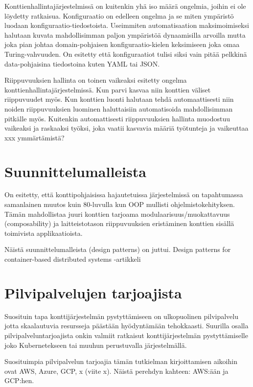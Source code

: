 \documentclass[finnish]{tktltiki2}
\theoremstyle{definition}
\theoremstyle{remark}
\begin{document}
Konttienhallintajärjestelmissä on kuitenkin yhä iso määrä ongelmia, joihin ei ole löydetty ratkaisua. Konfiguraatio on edelleen ongelma ja se miten ympäristö luodaan konfiguraatio-tiedostoista. Useimmiten automatisaation maksimoimiseksi halutaan kuvata mahdollisimman paljon ympäristöä dynaamisilla arvoilla mutta joka pian johtaa domain-pohjaisen konfiguraatio-kielen keksimiseen joka omaa Turing-vahvuuden. On esitetty että konfiguraatiot tulisi siksi vain pitää pelkkinä data-pohjaisina tiedostoina kuten YAML tai JSON.

Riippuvuuksien hallinta on toinen vaikeaksi esitetty ongelma konttienhallintajärjestelmissä. Kun parvi kasvaa niin konttien väliset riippuvuudet myös. Kun konttien luonti halutaan tehdä automaattisesti niin noiden riippuvuuksien luominen haluttaisiin automatisoida mahdollisimman pitkälle myös. Kuitenkin automattisesti riippuvuuksien hallinta muodostuu vaikeaksi ja raskaaksi työksi, joka vaatii kasvavia määriä työtunteja ja vaikeuttaa xxx ymmärtämistä?

\section{Suunnittelumalleista}

On esitetty, että konttipohjaisissa hajautetuissa järjestelmissä on tapahtumassa samanlainen muutos kuin 80-luvulla kun OOP mullisti ohjelmistokehityksen. Tämän mahdollistaa juuri konttien tarjoama modulaarisuus/muokattavuus (composability) ja laitteistotason riippuvuuksien eristäminen konttien sisällä toimivista applikaatioista.

Näistä suunnittelumalleista (design patterns) on juttui. Design patterns for container-based distributed systems
 -artikkeli \cite{container-design-patterns}

\section{Pilvipalvelujen tarjoajista}

Suosituin tapa konttijärjestelmän pystyttämiseen on ulkopuolinen pilvipalvelu jotta skaalautuvia resursseja päästään hyödyntämään tehokkaasti. Suurilla osalla pilvipalveluntarjoajista onkin valmiit ratkaisut konttijärjestelmän pystyttämiselle joko Kubernetekseen tai muuhun perustuvalla järjestelmällä.

Suosituimpia pilvipalvelun tarjoajia tämän tutkielman kirjoittamisen aikoihin ovat AWS, Azure, GCP, x (viite x). Näistä perehdyn kahteen: AWS:ään ja GCP:hen.
\end{document}
